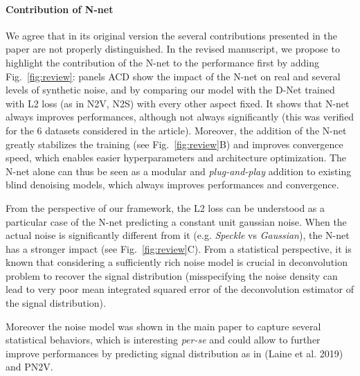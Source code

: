\documentclass{article}
\begin{document}
\paragraph{Contribution of N-net}
We agree that in its original version the several contributions presented in the paper are not properly distinguished.
In the revised manuscript, we propose to highlight the contribution of the N-net to the performance first by adding Fig.~\ref{fig:review}: panels ACD show the impact of the N-net on real and several levels of synthetic noise, and by comparing our model with the D-Net trained with L2 loss (as in N2V, N2S) with every other aspect fixed.
It shows that N-net always improves performances, although not always significantly (this was verified for the 6 datasets considered in the article). Moreover, the addition of the N-net greatly stabilizes the training (see Fig.~\ref{fig:review}B) and improves convergence speed, which enables easier hyperparameters and architecture optimization.
The N-net alone can thus be seen as a modular and \textit{plug-and-play} addition to existing blind denoising models, which always improves performances and convergence.

From the perspective of our framework, the L2 loss can be understood as a particular case of the N-net predicting a constant unit gaussian noise. When the actual noise is significantly different from it (e.g. \textit{Speckle} vs \textit{Gaussian}), the N-net has a stronger impact (see Fig.~\ref{fig:review}C).
From a statistical perspective,  it is known that considering a sufficiently rich noise model is crucial in deconvolution problem to recover the signal distribution (misspecifying the noise density can lead to very poor mean integrated squared error of the deconvolution estimator of the signal distribution).

Moreover the noise model was shown in the main paper to capture several statistical behaviors, which is interesting \textit{per-se} and could allow to further improve performances by predicting signal distribution as in (Laine et al. 2019) and PN2V.
\end{document}
